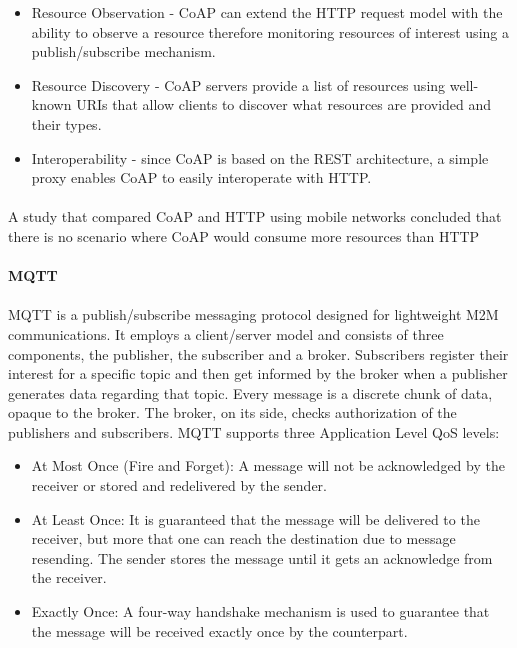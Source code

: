 \begin{itemize}
	\item Resource Observation - \ac{CoAP} can extend the \ac{HTTP} request model with the ability to observe a resource therefore monitoring resources of interest using a publish/subscribe mechanism.\\
	\item Resource Discovery - \ac{CoAP} servers provide a list of resources using well-known {URIs} that allow clients to discover what resources are provided and their types.\\
	\item Interoperability - since \ac{CoAP} is based on the \ac{REST} architecture, a simple proxy enables \ac{CoAP} to easily interoperate with \ac{HTTP}.
\end{itemize}

\paragraph{}
A study that compared \ac{CoAP} and \ac{HTTP} using mobile networks concluded that there is no scenario where \ac{CoAP} would consume more resources than \ac{HTTP} \cite{Savolainen2014}

\paragraph{\textbf{\ac{MQTT}}}
\paragraph{}
	\ac{MQTT} is a publish/subscribe messaging protocol designed for lightweight \ac{M2M} communications. It employs a client/server model and consists of three components, the publisher, the subscriber and a broker.
Subscribers register their interest for a specific topic and then get informed by the broker when a publisher generates data regarding that topic. Every message is a discrete chunk of data, opaque to the broker. The broker, on its side, checks authorization of the publishers and subscribers. \ac{MQTT} supports three Application Level \ac{QoS} levels:

\begin{itemize}
	\item At Most Once (Fire and Forget): A message will not be acknowledged by the receiver or stored and redelivered by the sender.\\
	\item At Least Once: It is guaranteed that the message will be delivered to the receiver, but more that one can reach the destination due to message resending. The sender stores the message until it gets an acknowledge from the receiver.\\
	\item Exactly Once: A four-way handshake mechanism is used to guarantee that the message will be received exactly once by the counterpart.
\end{itemize}

